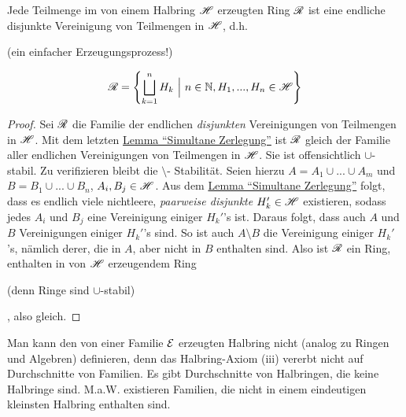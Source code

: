 \begin{proposition}
\begin{mdframed}
Jede Teilmenge im von einem Halbring $\mathscr{H}$ erzeugten Ring $\mathscr{R}$ ist eine endliche disjunkte Vereinigung von Teilmengen in $\mathscr{H}$, d.h. \begin{scriptsize}(ein einfacher Erzeugungsprozess!)\end{scriptsize} 
\begin{equation}
\mathscr{R} = \left\{ \bigsqcup_{k=1}^n H_k \  \Big\rvert \ n\in \mathbb{N}, H_1,...,H_n \in \mathscr{H} \right\}
\label{eqI14}
\end{equation}
\end{mdframed}
\begin{proof}
Sei $\mathscr{R}$ die Familie der endlichen \emph{disjunkten} Vereinigungen von Teilmengen in $\mathscr{H}$. Mit dem letzten \hyperref[lemmaA]{Lemma ``Simultane Zerlegung''} ist $\mathscr{R}$ gleich der Familie aller endlichen Vereinigungen von Teilmengen in $\mathscr{H}$. Sie ist offensichtlich $\cup$-stabil. Zu verifizieren bleibt die $\setminus$- Stabilität. Seien hierzu $A = A_1 \cup ... \cup A_m$ und $B = B_1 \cup ... \cup B_n$, $A_i, B_j \in \mathscr{H}$. Aus dem \hyperref[lemmaA]{Lemma ``Simultane Zerlegung''} folgt, dass es endlich viele nichtleere, \emph{paarweise disjunkte} $H_k' \in \mathscr{H}$ existieren, sodass jedes $A_i$ und $B_j$ eine Vereinigung einiger $H_k'$'s ist. Daraus folgt, dass auch $A$ und $B$ Vereinigungen einiger $H_k'$'s sind. So ist auch $A\setminus B$ die Vereinigung einiger $H_k'$'s, nämlich derer, die in $A$, aber nicht in $B$ enthalten sind. Also ist $\mathscr{R}$ ein Ring, enthalten in von $\mathscr{H}$ erzeugendem Ring\begin{scriptsize}(denn Ringe sind $\cup$-stabil)\end{scriptsize}, also gleich.
\end{proof}
\end{proposition}

\begin{remark}
Man kann den von einer Familie $\mathcal{E}$ erzeugten Halbring nicht (analog zu Ringen und Algebren) definieren, denn das Halbring-Axiom (iii) vererbt nicht auf Durchschnitte von Familien. Es gibt Durchschnitte von Halbringen, die keine Halbringe sind. M.a.W. existieren Familien, die nicht in einem eindeutigen kleinsten Halbring enthalten sind.
\end{remark}

